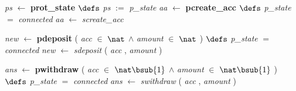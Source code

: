 \bresetindent
%
%
\vspace{-4.5ex}\bsetindent
\begin{tabbing}
\bSetTabs
\+\>
%
%
{\em ps\/} $\longleftarrow$  {\bf { prot\_state}}  \bhsp $\defs$ \+ \bnl
{\em ps\/} $:=$  {\em p\_state\/} \- \bOperationSemiColon \bbnl
%
%
{\em aa\/} $\longleftarrow$  {\bf { pcreate\_acc}}  \bhsp $\defs$ \+ \bnl
  \+\bnl
{\em p\_state\/} $=$ {\em connected\/} \-\bnl
{} \+\bnl
{\em aa\/} $\longleftarrow$ {\em screate\_acc\/}\label{screate_acc}  \-\bnl
{}  \- \bOperationSemiColon 
\end{tabbing}
\bresetindent
%
%
\vspace{-4.5ex}\bsetindent
\begin{tabbing}
\bSetTabs
\+\>
%
%
{\em new\/} $\longleftarrow$  {\bf { pdeposit}} ( {\em acc\/} $\in$  $\nat$  $\wedge$
{\em amount\/} $\in$  $\nat$  ) \bhsp $\defs$ \+ \bnl
  \+\bnl
{\em p\_state\/} $=$ {\em connected\/} \-\bnl
{} \+\bnl
{\em new\/} $\longleftarrow$ {\em sdeposit\/}\label{sdeposit}  ( {\em acc\/} , {\em amount\/} )  \-\bnl
{}  \- \bOperationSemiColon 
\end{tabbing}
\bresetindent
%
%
\vspace{-4.5ex}\bsetindent
\begin{tabbing}
\bSetTabs
\+\>
%
%
{\em ans\/} $\longleftarrow$  {\bf { pwithdraw}} ( {\em acc\/} $\in$  $\nat\bsub{1}$  $\wedge$
{\em amount\/} $\in$  $\nat\bsub{1}$  ) \bhsp $\defs$ \+ \bnl
  \+\bnl
{\em p\_state\/} $=$ {\em connected\/} \-\bnl
{} \+\bnl
{\em ans\/} $\longleftarrow$ {\em swithdraw\/}\label{swithdraw}  ( {\em acc\/} , {\em amount\/} )  \-\bnl
{}  \- \bOperationSemiColon 
\end{tabbing}
